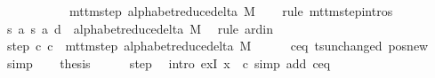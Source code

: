 \begin{isabellebody}
\ \ \ \ \ \ \ \ \ \ {\isasymin}\ mttm{\isacharunderscore}{\kern0pt}step\ {\isacharparenleft}{\kern0pt}alphabet{\isacharunderscore}{\kern0pt}reduce{\isacharunderscore}{\kern0pt}delta\ M{\isacharparenright}{\kern0pt}{\isachardoublequoteclose}\isanewline
\ \ \isamarkupfalse%
\ {\isacharparenleft}{\kern0pt}rule\ mttm{\isacharunderscore}{\kern0pt}step{\isachardot}{\kern0pt}intros{\isacharparenright}{\kern0pt}\isanewline
\ \ \ \ \isamarkupfalse%
\ {\isachardoublequoteopen}{\isacharparenleft}{\kern0pt}{\isacharquery}{\kern0pt}s{\isacharcomma}{\kern0pt}\ {\isacharquery}{\kern0pt}a{\isacharcomma}{\kern0pt}\ {\isacharquery}{\kern0pt}s{\isacharprime}{\kern0pt}{\isacharcomma}{\kern0pt}\ {\isacharquery}{\kern0pt}a{\isacharcomma}{\kern0pt}\ {\isacharquery}{\kern0pt}d{\isacharparenright}{\kern0pt}\ {\isasymin}\ alphabet{\isacharunderscore}{\kern0pt}reduce{\isacharunderscore}{\kern0pt}delta\ M{\isachardoublequoteclose}\ \isamarkupfalse%
\ {\isacharparenleft}{\kern0pt}rule\ ard{\isacharunderscore}{\kern0pt}in{\isacharparenright}{\kern0pt}\isanewline
\ \ \isamarkupfalse%
\isanewline
\ \ \isamarkupfalse%
\ step{\isacharcolon}{\kern0pt}\ {\isachardoublequoteopen}{\isacharparenleft}{\kern0pt}c{\isacharprime}{\kern0pt}{\isacharcomma}{\kern0pt}\ {\isacharquery}{\kern0pt}c{\isacharprime}{\kern0pt}{\isacharprime}{\kern0pt}{\isacharparenright}{\kern0pt}\ {\isasymin}\ mttm{\isacharunderscore}{\kern0pt}step\ {\isacharparenleft}{\kern0pt}alphabet{\isacharunderscore}{\kern0pt}reduce{\isacharunderscore}{\kern0pt}delta\ M{\isacharparenright}{\kern0pt}{\isachardoublequoteclose}\isanewline
\ \ \ \ \isamarkupfalse%
\ c{\isacharprime}{\kern0pt}{\isacharunderscore}{\kern0pt}eq\ ts{\isacharunderscore}{\kern0pt}unchanged\ pos{\isacharunderscore}{\kern0pt}new\ \isamarkupfalse%
\ simp\isanewline
\ \ \isamarkupfalse%
\ {\isacharquery}{\kern0pt}thesis\isanewline
\ \ \ \ \isamarkupfalse%
\ step\ \isamarkupfalse%
\ {\isacharparenleft}{\kern0pt}intro\ exI{\isacharbrackleft}{\kern0pt}\ x\ {\isacharequal}{\kern0pt}\ {\isacharquery}{\kern0pt}c{\isacharprime}{\kern0pt}{\isacharprime}{\kern0pt}{\isacharbrackright}{\kern0pt}{\isacharparenright}{\kern0pt}\ {\isacharparenleft}{\kern0pt}simp\ add{\isacharcolon}{\kern0pt}\ c{\isacharprime}{\kern0pt}{\isacharunderscore}{\kern0pt}eq{\isacharparenright}{\kern0pt}\isanewline
{}\isamarkupfalse%
%
\endisatagproof
{\isafoldproof}%
%
\isadelimproof
\isanewline
%
\endisadelimproof
%
\isadelimtheory
\isanewline
%
\endisadelimtheory
%
\isatagtheory
{}\isamarkupfalse%
%
\endisatagtheory
{\isafoldtheory}%
%
\isadelimtheory
%
\endisadelimtheory
%
\end{isabellebody}%
